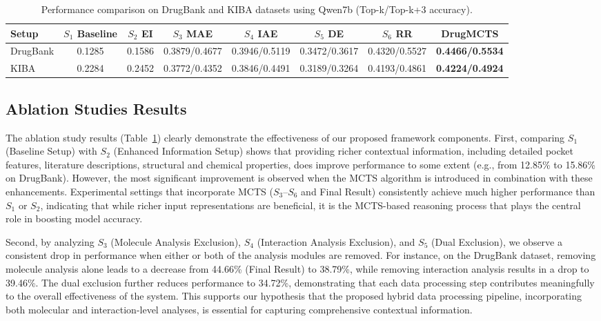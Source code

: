 \documentclass[letterpaper,twocolumn,10pt]{llncs}
\begin{document}
\begin{table}[h]
\centering
\caption{Performance comparison on DrugBank and KIBA datasets using Qwen7b (Top-k/Top-k+3 accuracy).}
\label{tab:ablation_setups}
\setlength{\tabcolsep}{4pt} %
\small %
\begin{tabular}{@{}lccccccc@{}} %
\toprule
\textbf{Setup} & \textbf{$S_1$ Baseline} & \textbf{$S_2$ EI} & \textbf{$S_3$ MAE} & \textbf{$S_4$ IAE} & \textbf{$S_5$ DE} & \textbf{$S_6$ RR} & \textbf{DrugMCTS} \\
\midrule
DrugBank & 0.1285 & 0.1586 & 0.3879/0.4677 & 0.3946/0.5119 & 0.3472/0.3617 & 0.4320/0.5527 & \textbf{0.4466/0.5534} \\
KIBA     & 0.2284 & 0.2452 & 0.3772/0.4352 & 0.3846/0.4491 & 0.3189/0.3264 & 0.4193/0.4861 & \textbf{0.4224/0.4924} \\
\bottomrule
\end{tabular}
\end{table}

\subsection{Ablation Studies Results}
The ablation study results (Table~\ref{tab:ablation_setups}) clearly demonstrate the effectiveness of our proposed framework components. First, comparing $S_1$ (Baseline Setup) with $S_2$ (Enhanced Information Setup) shows that providing richer contextual information, including detailed pocket features, literature descriptions, structural and chemical properties, does improve performance to some extent (e.g., from 12.85\% to 15.86\% on DrugBank). However, the most significant improvement is observed when the MCTS algorithm is introduced in combination with these enhancements. Experimental settings that incorporate MCTS ($S_3$–$S_6$ and Final Result) consistently achieve much higher performance than $S_1$ or $S_2$, indicating that while richer input representations are beneficial, it is the MCTS-based reasoning process that plays the central role in boosting model accuracy.

Second, by analyzing $S_3$ (Molecule Analysis Exclusion), $S_4$ (Interaction Analysis Exclusion), and $S_5$ (Dual Exclusion), we observe a consistent drop in performance when either or both of the analysis modules are removed. For instance, on the DrugBank dataset, removing molecule analysis alone leads to a decrease from 44.66\% (Final Result) to 38.79\%, while removing interaction analysis results in a drop to 39.46\%. The dual exclusion further reduces performance to 34.72\%, demonstrating that each data processing step contributes meaningfully to the overall effectiveness of the system. This supports our hypothesis that the proposed hybrid data processing pipeline, incorporating both molecular and interaction-level analyses, is essential for capturing comprehensive contextual information.
\end{document}

